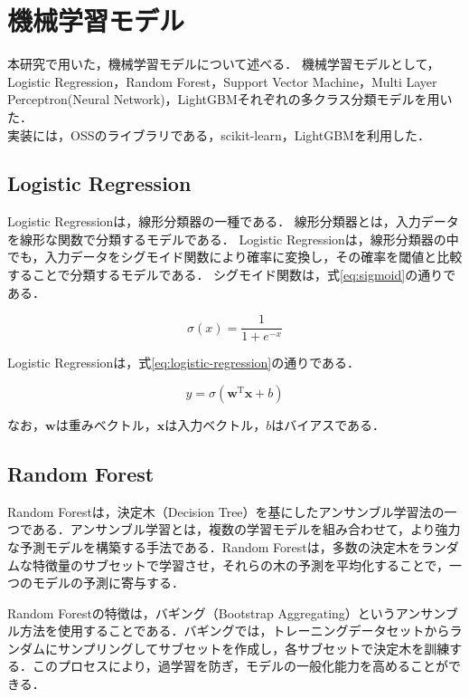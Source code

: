 \section{機械学習モデル}\label{sec:ml-model}

本研究で用いた，機械学習モデルについて述べる．
機械学習モデルとして，Logistic Regression，Random Forest，Support Vector Machine，Multi Layer Perceptron(Neural Network)，LightGBMそれぞれの多クラス分類モデルを用いた．\\
実装には，OSSのライブラリである，scikit-learn\cite{scikit-learn}，LightGBM\cite{lightgbm}を利用した．

\subsection{Logistic Regression}

Logistic Regressionは，線形分類器の一種である．
線形分類器とは，入力データを線形な関数で分類するモデルである．
Logistic Regressionは，線形分類器の中でも，入力データをシグモイド関数により確率に変換し，その確率を閾値と比較することで分類するモデルである．
シグモイド関数は，式\ref{eq:sigmoid}の通りである．

\begin{equation}
  \label{eq:sigmoid}
  \sigma(x) = \frac{1}{1 + e^{-x}}
\end{equation}

Logistic Regressionは，式\ref{eq:logistic-regression}の通りである．

\begin{equation}
  \label{eq:logistic-regression}
  y = \sigma\left(\boldsymbol{w}^{\mathrm{T}}\boldsymbol{x}+ b \right)
\end{equation}

なお，$\boldsymbol{w}$は重みベクトル，$\boldsymbol{x}$は入力ベクトル，$b$はバイアスである．

\subsection{Random Forest}
Random Forestは，決定木（Decision Tree）を基にしたアンサンブル学習法の一つである．アンサンブル学習とは，複数の学習モデルを組み合わせて，より強力な予測モデルを構築する手法である．Random Forestは，多数の決定木をランダムな特徴量のサブセットで学習させ，それらの木の予測を平均化することで，一つのモデルの予測に寄与する．

Random Forestの特徴は，バギング（Bootstrap Aggregating）というアンサンブル方法を使用することである．バギングでは，トレーニングデータセットからランダムにサンプリングしてサブセットを作成し，各サブセットで決定木を訓練する．このプロセスにより，過学習を防ぎ，モデルの一般化能力を高めることができる．

